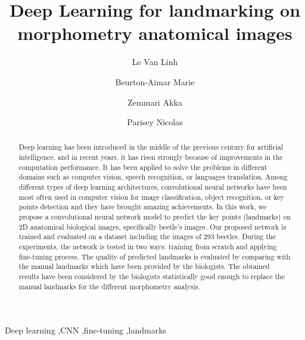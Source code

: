 \documentclass[review]{elsarticle}
\begin{document}
\begin{frontmatter}

\title{Deep Learning for landmarking on morphometry anatomical images}


\author[labri,itdlu]{Le Van Linh}
\author[labri]{Beurton-Aimar Marie}
\author[labri]{Zemmari Akka}
\author[igepp]{Parisey Nicolas}


\address[labri]{University of Bordeaux, 351, cours de la Libération, 33405 Talence, France}

\address[igepp]{UMR 1349 IGEPP, BP 35327, 35653 Le Rheu, France}
\address[itdlu]{Dalat University, Dalat, Lamdong, Vietnam}

\begin{abstract}
Deep learning has been introduced in the middle of the previous century for artificial intelligence, and in recent years, it has risen strongly because of improvements in the computation performance. It has been applied to solve the problems in different domains such as computer vision, speech recognition, or languages translation. Among different types of deep learning architectures, convolutional neural networks have been most often used in computer vision for image classification, object recognition, or key points detection and they have brought amazing achievements. In this work, we propose a convolutional neural network model to predict the key points (landmarks) on 2D anatomical biological images, specifically beetle's images. Our proposed network is trained and evaluated on a dataset including the images of $293$ beetles. During the experiments, the network is tested in two ways: training from scratch and applying fine-tuning process. The quality of predicted landmarks is evaluated by comparing with the manual landmarks which have been provided by the biologists. The obtained results have been considered by the biologists statistically good enough to replace the manual landmarks for the different morphometry analysis.
\end{abstract}

\begin{keyword}
Deep learning \sep CNN \sep fine-tuning \sep landmarks
\end{keyword}

\end{frontmatter}
\end{document}
